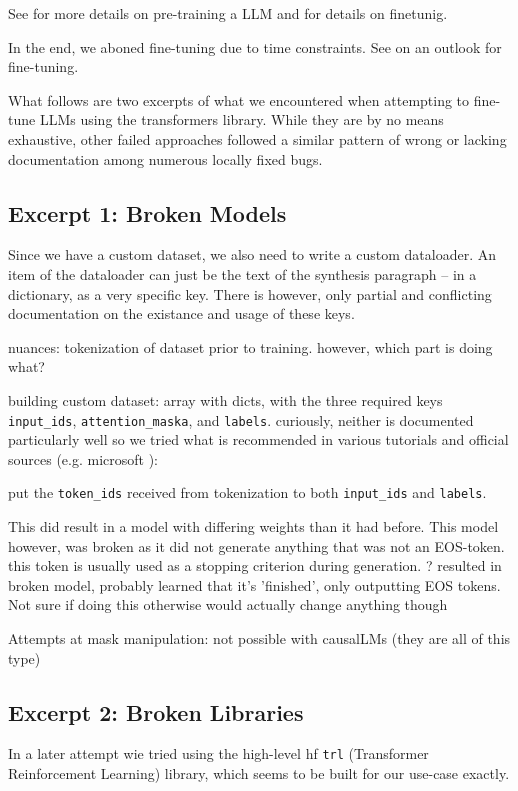 See  for more details on pre-training a \gls{LLM} and  for details on finetunig.

In the end, we aboned fine-tuning due to time constraints. See  on an outlook for fine-tuning.

What follows are two excerpts of what we encountered when attempting to fine-tune \glspl{LLM} using the \gls{transformers} library.
While they are by no means exhaustive, other failed approaches followed a similar pattern of wrong or lacking documentation among numerous locally fixed bugs.

\subsection{Excerpt 1: Broken Models}\label{sub:brokenft}
Since we have a custom dataset, we also need to write a custom dataloader.
An item of the dataloader can just be the text of the synthesis paragraph -- in a dictionary, as a very specific key.
There is however, only partial and conflicting documentation on the existance and usage of these keys.

nuances: tokenization of dataset prior to training. however, which part is doing what?

building custom dataset: array with dicts, with the three required keys \verb`input_ids`, \verb`attention_maska`, and \verb`labels`. curiously, neither is documented particularly well so we tried what is recommended in various tutorials and official sources (e.g. microsoft \cite{deepspeedexamples_2023}): 

put the \verb`token_ids` received from tokenization to both \verb`input_ids` and \verb`labels`.

This did result in a model with differing weights than it had before. This model however, was broken as it did not generate anything that was not an EOS-token.
this token is usually used as a stopping criterion during generation.
? resulted in broken model, probably learned that it's 'finished', only outputting EOS tokens. Not sure if doing this otherwise would actually change anything though

Attempts at mask manipulation: not possible with causalLMs (they are all of this type)

\subsection{Excerpt 2: Broken Libraries}\label{sub:libraries}
In a later attempt wie tried using the high-level \gls{hf} \verb`trl` (Transformer Reinforcement Learning) library, which seems to be built for our use-case exactly.

